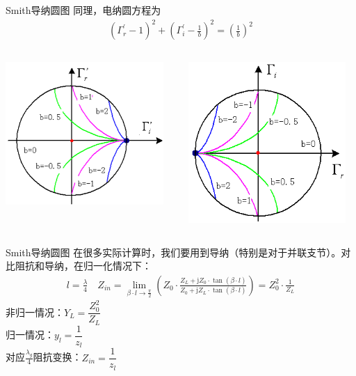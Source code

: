 \begin{frame}{Smith导纳圆图}
  同理，电纳圆方程为
  \begin{align*}
    (\Gamma_r^{'}-1)^2+\left(\Gamma_i^{'}-\frac{1}{b}\right)^2=\left(\frac{1}{b}\right)^2
  \end{align*}
  \begin{columns}
    \begin{column}{0.5\linewidth}
      \includegraphics[width=6cm]{Cha4//equal_B_circle1.png}
    \end{column}
    \begin{column}{0.5\linewidth}
      \includegraphics[width=6cm]{Cha4//equal_B_circle2.png}
    \end{column}
  \end{columns}

\end{frame}

\begin{frame}{Smith导纳圆图}
  在很多实际计算时，我们要用到导纳（特别是对于并联支节）。对比阻抗和导纳，在归一化情况下：
  \begin{align*}
    l=\frac{\lambda}{4} \quad Z_{in}=\lim_{\beta\cdot l\to \frac{\pi}{2}}\left(Z_0\cdot\frac{Z_L+\mathrm{j}Z_0\cdot\tan(\beta\cdot l)}{Z_0+\mathrm{j}Z_L\cdot\tan(\beta\cdot l)}\right)=Z_0^2\cdot\frac{1}{Z_L}
  \end{align*}
  非归一情况：$Y_L=\dfrac{Z_0^2}{Z_L}$ \\
  归一情况：$y_l=\dfrac{1}{z_l}$\\
  对应$\frac{\lambda_g}{4}$阻抗变换：$Z_{in}=\dfrac{1}{z_l}$
\end{frame}


